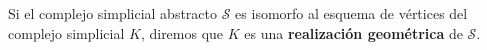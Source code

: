 \begin{definicion}
	Si el complejo simplicial abstracto $\mathcal{S}$ es isomorfo al esquema de vértices del 
	complejo simplicial $K$, diremos que $K$ es una \textbf{realización geométrica} de $\mathcal{S}$.
\end{definicion}


\endinput
